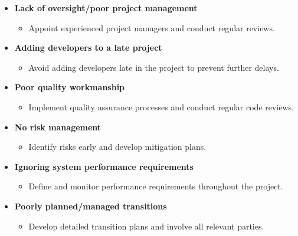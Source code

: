 \documentclass[10pt]{article}
\begin{document}
\begin{multicols}{5}
  \begin{block}
  \begin{itemize}
    \item \textbf{Lack of oversight/poor project management}
    \begin{itemize}
      \item Appoint experienced project managers and conduct regular reviews.
    \end{itemize}
    \item \textbf{Adding developers to a late project}
    \begin{itemize}
      \item Avoid adding developers late in the project to prevent further delays.
    \end{itemize}
  \end{itemize}
  \end{block}
  
  \begin{block}
  \begin{itemize}
    \item \textbf{Poor quality workmanship}
    \begin{itemize}
      \item Implement quality assurance processes and conduct regular code reviews.
    \end{itemize}
    \item \textbf{No risk management}
    \begin{itemize}
      \item Identify risks early and develop mitigation plans.
    \end{itemize}
    \item \textbf{Ignoring system performance requirements}
    \begin{itemize}
      \item Define and monitor performance requirements throughout the project.
    \end{itemize}
    \item \textbf{Poorly planned/managed transitions}
    \begin{itemize}
      \item Develop detailed transition plans and involve all relevant parties.
    \end{itemize}
  \end{itemize}
  \end{block}


\end{multicols}
\end{document}
